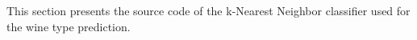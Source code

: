 This section presents the source code of the k-Nearest Neighbor classifier used for the wine type prediction.



